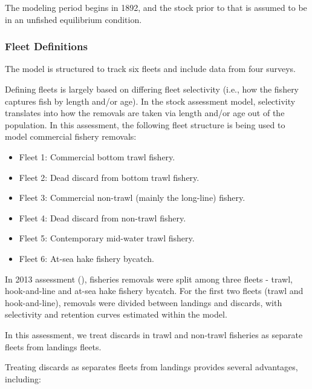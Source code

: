 \documentclass[
]{scrartcl}
\providecommand{\tightlist}{%
  \setlength{\itemsep}{0pt}\setlength{\parskip}{0pt}}\usepackage{longtable,booktabs,array}
\begin{document}
The modeling period begins in 1892, and the stock prior to that is
assumed to be in an unfished equilibrium condition.

\subsubsection{Fleet Definitions}\label{sec-fleet}

The model is structured to track six fleets and include data from four
surveys.

Defining fleets is largely based on differing fleet selectivity (i.e.,
how the fishery captures fish by length and/or age). In the stock
assessment model, selectivity translates into how the removals are taken
via length and/or age out of the population. In this assessment, the
following fleet structure is being used to model commercial fishery
removals:

\begin{itemize}
\tightlist
\item
  Fleet 1: Commercial bottom trawl fishery.
\item
  Fleet 2: Dead discard from bottom trawl fishery.
\item
  Fleet 3: Commercial non-trawl (mainly the long-line) fishery.
\item
  Fleet 4: Dead discard from non-trawl fishery.
\item
  Fleet 5: Contemporary mid-water trawl fishery.
\item
  Fleet 6: At-sea hake fishery bycatch.
\end{itemize}

In 2013 assessment (), fisheries removals were split among three fleets - trawl,
hook-and-line and at-sea hake fishery bycatch. For the first two fleets
(trawl and hook-and-line), removals were divided between landings and
discards, with selectivity and retention curves estimated within the
model.

In this assessment, we treat discards in trawl and non-trawl fisheries
as separate fleets from landings fleets.

Treating discards as separates fleets from landings provides several
advantages, including:
\end{document}
